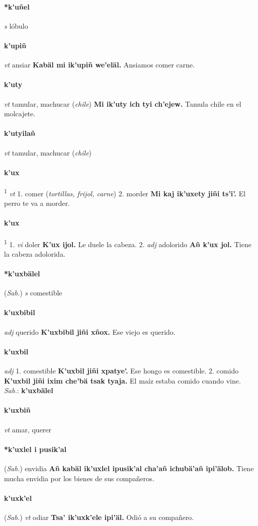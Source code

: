 \documentclass{scrbook}
\newcommand{\entry}[1]{\paragraph{#1}}
\newcommand{\onedefinition}[1]{#1.}
\newcommand{\defsuperscript}[1]{\textsuperscript{1}}
\newcommand{\partofspeech}[1]{\textit{#1}}
\newcommand{\spanishtranslation}[1]{#1}
\newcommand{\clarification}[1]{(\textit{#1})}
\newcommand{\cholexample}[1]{\textbf{#1}}
\newcommand{\exampletranslation}[1]{#1}
\newcommand{\dialectvariant}[1]{\\\textit{#1}:}
\newcommand{\dialectword}[1]{\textbf{#1}}
\newcommand{\relevantdialect}[1]{(\textit{#1})}
\begin{document}
\begin{multicols}{2}
\entry{*k'uñel}
\partofspeech{s}
\spanishtranslation{lóbulo}

\entry{k'upiñ}
\partofspeech{vt}
\spanishtranslation{ansiar}
\cholexample{Kabäl mi ik'upiñ we'eläl.}
\exampletranslation{Ansiamos comer carne.}

\entry{k'uty}
\partofspeech{vt}
\spanishtranslation{tamular, machucar}
\clarification{chile}
\cholexample{Mi ik'uty ich tyi ch'ejew.}
\exampletranslation{Tamula chile en el molcajete.}

\entry{k'utyilañ}
\partofspeech{vt}
\spanishtranslation{tamular, machucar}
\clarification{chile}

\entry{k'ux}
\defsuperscript{1}
\partofspeech{vt}
\onedefinition{1}
\spanishtranslation{comer}
\clarification{tortillas, frijol, carne}
\onedefinition{2}
\spanishtranslation{morder}
\cholexample{Mi kaj ik'uxety jiñi ts'i'.}
\exampletranslation{El perro te va a morder.}

\entry{k'ux}
\defsuperscript{2}
\onedefinition{1}
\partofspeech{vi}
\spanishtranslation{doler}
\cholexample{K'ux ijol.}
\exampletranslation{Le duele la cabeza.}
\onedefinition{2}
\partofspeech{adj}
\spanishtranslation{adolorido}
\cholexample{Añ k'ux jol.}
\exampletranslation{Tiene la cabeza adolorida.}

\entry{*k'uxbälel}
\relevantdialect{Sab.}
\partofspeech{s}
\spanishtranslation{comestible}

\entry{k'uxbibil}
\partofspeech{adj}
\spanishtranslation{querido}
\cholexample{K'uxbibil jiñi xñox.}
\exampletranslation{Ese viejo es querido.}

\entry{k'uxbil}
\partofspeech{adj}
\onedefinition{1}
\spanishtranslation{comestible}
\cholexample{K'uxbil jiñi xpatye'.}
\exampletranslation{Ese hongo es comestible.}
\onedefinition{2}
\spanishtranslation{comido}
\cholexample{K'uxbil jiñi ixim che'bä tsak tyaja.}
\exampletranslation{El maíz estaba comido cuando vine.}
\dialectvariant{Sab.}
\dialectword{k'uxbälel}

\entry{k'uxbiñ}
\partofspeech{vt}
\spanishtranslation{amar, querer}

\entry{*k'uxlel i pusik'al}
\relevantdialect{Sab.}
\spanishtranslation{envidia}
\cholexample{Añ kabäl ik'uxlel ipusik'al cha'añ ichubä'añ ipi'älob.}
\exampletranslation{Tiene mucha envidia por los bienes de sus compañeros.}

\entry{k'uxk'el}
\relevantdialect{Sab.}
\partofspeech{vt}
\spanishtranslation{odiar}
\cholexample{Tsa' ik'uxk'ele ipi'äl.}
\exampletranslation{Odió a su compañero.}


\end{multicols}
\end{document}

